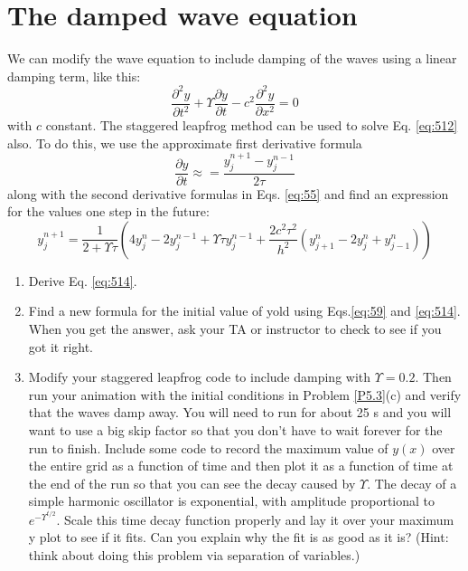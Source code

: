 \section*{The damped wave equation}
We can modify the wave equation to include damping of the waves using a linear
damping term, like this:
\begin{equation}\label{eq:512}
\frac{\partial^2 y}{\partial t^2} + \Upsilon \frac{\partial y}{\partial t} - c^2 \frac{\partial^2 y}{\partial x^2} = 0
\end{equation}
with $c$ constant. The staggered leapfrog method can be used to solve Eq. \eqref{eq:512}
also. To do this, we use the approximate first derivative formula
\begin{equation}\label{eq:513}
\frac{\partial y}{\partial t } \approx = \frac{y_j^{n+1} - y_j^{n-1}}{2 \tau}
\end{equation}
along with the second derivative formulas in Eqs. \eqref{eq:55} and find an expression for
the values one step in the future:
\begin{equation}\label{eq:514}
y^{n+1}_j = \frac{1}{2+ \Upsilon \tau}(4y^n_j-2y^{n-1}_j+ \Upsilon \tau y^{n-1}_j + \frac{2c^2 \tau^2}{h^2}(y^n_{j+1} - 2y^n_j + y^n_{j-1}))
\end{equation}
\begin{problem}\label{P5.4} 
\begin{enumerate}[label=(\alph*)]
	\item Derive Eq. \eqref{eq:514}.
	\item Find a new formula for the initial value of yold using Eqs.\eqref{eq:59} and
\eqref{eq:514}. When you get the answer, ask your TA or instructor to check to
see if you got it right.
\item Modify your staggered leapfrog code to include damping with $ \Upsilon = 0.2$.
Then run your animation with the initial conditions in Problem \ref{P5.3}(c)
and verify that the waves damp away. You will need to run for about
25 s and you will want to use a big skip factor so that you don\rq t have
to wait forever for the run to finish. Include some code to record the
maximum value of $y(x)$ over the entire grid as a function of time and
then plot it as a function of time at the end of the run so that you can
see the decay caused by $\Upsilon$. The decay of a simple harmonic oscillator
is exponential, with amplitude proportional to $e^{−\Upsilon^{ t/2}}$. Scale this time
decay function properly and lay it over your maximum y plot to see if
it fits. Can you explain why the fit is as good as it is? (Hint: think about
doing this problem via separation of variables.)

\end{enumerate}
\end{problem}

